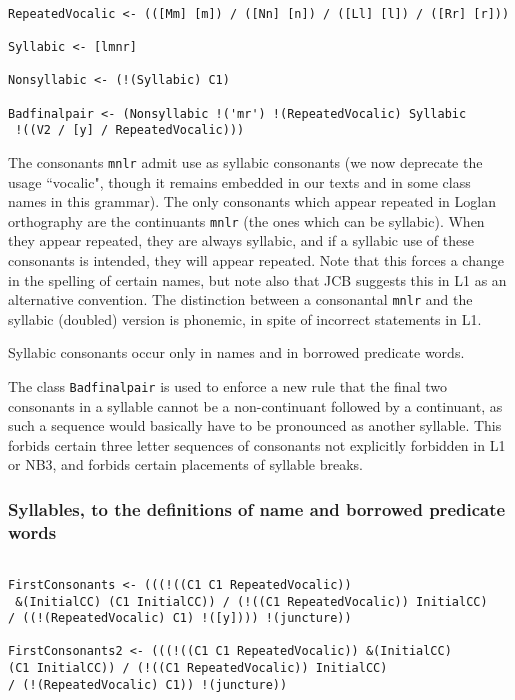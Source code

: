 \documentclass[12pt]{article}
\begin{document}
\begin{verbatim}

RepeatedVocalic <- (([Mm] [m]) / ([Nn] [n]) / ([Ll] [l]) / ([Rr] [r]))

Syllabic <- [lmnr]

Nonsyllabic <- (!(Syllabic) C1)

Badfinalpair <- (Nonsyllabic !('mr') !(RepeatedVocalic) Syllabic
 !((V2 / [y] / RepeatedVocalic)))

\end{verbatim}

The consonants {\tt mnlr} admit use as syllabic consonants (we now deprecate the usage ``vocalic", though it
remains embedded in our texts and in some class names in this grammar).  The only consonants which appear repeated
in Loglan orthography are the continuants {\tt mnlr} (the ones which can be syllabic).  When they appear repeated,
they are always syllabic, and if a syllabic use of these consonants is intended, they will appear repeated.  Note that this
forces a change in the spelling of certain names, but note also that JCB suggests this in L1 as an alternative convention.
The distinction between a consonantal {\tt mnlr} and the syllabic (doubled) version is phonemic, in spite of incorrect
statements in L1.

Syllabic consonants occur only in names and in borrowed predicate words.

The class {\tt Badfinalpair} is used to enforce a new rule that the final two consonants in a syllable cannot
be a non-continuant followed by a continuant, as such a sequence would basically have to be pronounced as another syllable.  This forbids certain three letter sequences of consonants not explicitly forbidden in L1 or NB3, and forbids
certain placements of syllable breaks.

\subsubsection{Syllables, to the definitions of name and borrowed predicate words}

\begin{verbatim}

FirstConsonants <- (((!((C1 C1 RepeatedVocalic))
 &(InitialCC) (C1 InitialCC)) / (!((C1 RepeatedVocalic)) InitialCC) 
/ ((!(RepeatedVocalic) C1) !([y]))) !(juncture))

FirstConsonants2 <- (((!((C1 C1 RepeatedVocalic)) &(InitialCC) 
(C1 InitialCC)) / (!((C1 RepeatedVocalic)) InitialCC) 
/ (!(RepeatedVocalic) C1)) !(juncture))

\end{verbatim}
\end{document}
